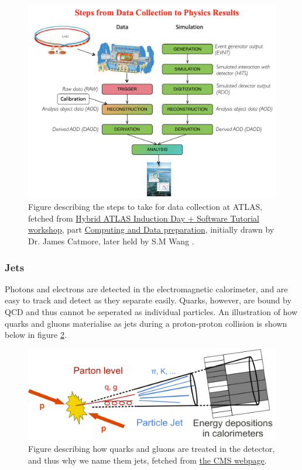 \begin{figure}[h!]
    \includegraphics[width=\linewidth]{Figures/atlas/data_col_phys.png}
    \caption[Steps from data collection to physics results]{Figure describing the steps to take for data collection at ATLAS, fetched from \href{https://indico.cern.ch/event/1159574/timetable/?view=standard}{Hybrid ATLAS Induction Day + Software Tutorial workshop}, part
    \href{https://indico.cern.ch/event/860971/contributions/3672974/attachments/1972049/3280896/Atlas_computing_data_preparation_jan20.pdf}{Computing and Data preparation}, 
    initially drawn by Dr. James Catmore, later held by S.M Wang \cite{Wang:2707056}. }
    \label{fig:atlas_data_col_phys}
\end{figure}


\subsubsection*{Jets}
Photons and electrons are detected in the electromagnetic calorimeter, and are easy to track and detect as they 
separate easily. Quarks, however, are bound by QCD and thus cannot be seperated as individual 
particles. An illustration of how quarks and gluons materialise as jets during a proton-proton 
collision is shown below in figure \ref{fig:cms_jets}.

\begin{figure}[h!]
    \includegraphics[width=\linewidth]{Figures/atlas/cms_Sketch_PartonParticleCaloJet.png}
    \caption[Jet produciton from pp-collisions to detector]{Figure describing how quarks and gluons are treated in the detector, and thus why we name them jets, fetched from \href{https://cms.cern/sites/default/files/field/image/Sketch_PartonParticleCaloJet.png}{the CMS webpage}. }
    \label{fig:cms_jets}
\end{figure}

